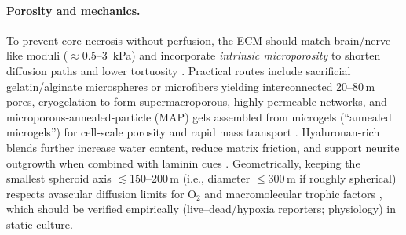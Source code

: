 \documentclass[referee,pdflatex, sn-vancouver-num]{sn-jnl}%
\theoremstyle{thmstyleone}%
\theoremstyle{thmstyletwo}%
\theoremstyle{thmstylethree}%
\begin{document}
\paragraph{Porosity and mechanics.}
To prevent core necrosis without perfusion, the ECM should match brain/nerve‐like moduli ($\approx$0.5–3~kPa) and incorporate \emph{intrinsic microporosity} to shorten diffusion paths and lower tortuosity \citep{Discher2005Stiffness,Budday2015BrainMech,Seidlits2010HALaminin}. Practical routes include sacrificial gelatin/alginate microspheres or microfibers yielding interconnected 20–80\,\textmu m pores, cryogelation to form supermacroporous, highly permeable networks, and microporous‐annealed‐particle (MAP) gels assembled from microgels (“annealed microgels”) for cell‐scale porosity and rapid mass transport \citep{Bencherif2012Cryogels,Lozinsky2018CryogelsReview,Griffin2015MAP,Highley2016HAReview}. Hyaluronan‐rich blends further increase water content, reduce matrix friction, and support neurite outgrowth when combined with laminin cues \citep{Seidlits2010HALaminin,Highley2016HAReview}. Geometrically, keeping the smallest spheroid axis $\lesssim$150–200\,\textmu m (i.e., diameter $\leq$300\,\textmu m if roughly spherical) respects avascular diffusion limits for O$_2$ and macromolecular trophic factors \citep{Sykova2008Diffusion,Grimes2014SpheroidOxygen}, which should be verified empirically (live–dead/hypoxia reporters; physiology) in static culture.


\end{document}
